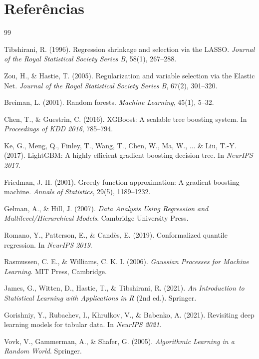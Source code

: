 \documentclass[12pt,a4paper]{article}
\begin{document}
\section{Referências}

\begin{thebibliography}{99}

 Tibshirani, R. (1996). Regression shrinkage and selection via the LASSO. \textit{Journal of the Royal Statistical Society Series B}, 58(1), 267--288.

 Zou, H., \& Hastie, T. (2005). Regularization and variable selection via the Elastic Net. \textit{Journal of the Royal Statistical Society Series B}, 67(2), 301--320.

 Breiman, L. (2001). Random forests. \textit{Machine Learning}, 45(1), 5--32.

 Chen, T., \& Guestrin, C. (2016). XGBoost: A scalable tree boosting system. In \textit{Proceedings of KDD 2016}, 785--794.

 Ke, G., Meng, Q., Finley, T., Wang, T., Chen, W., Ma, W., ... \& Liu, T.-Y. (2017). LightGBM: A highly efficient gradient boosting decision tree. In \textit{NeurIPS 2017}.

 Friedman, J. H. (2001). Greedy function approximation: A gradient boosting machine. \textit{Annals of Statistics}, 29(5), 1189--1232.

 Gelman, A., \& Hill, J. (2007). \textit{Data Analysis Using Regression and Multilevel/Hierarchical Models}. Cambridge University Press.

 Romano, Y., Patterson, E., \& Candès, E. (2019). Conformalized quantile regression. In \textit{NeurIPS 2019}.

 Rasmussen, C. E., \& Williams, C. K. I. (2006). \textit{Gaussian Processes for Machine Learning}. MIT Press, Cambridge.

 James, G., Witten, D., Hastie, T., \& Tibshirani, R. (2021). \textit{An Introduction to Statistical Learning with Applications in R} (2nd ed.). Springer.

 Gorishniy, Y., Rubachev, I., Khrulkov, V., \& Babenko, A. (2021). Revisiting deep learning models for tabular data. In \textit{NeurIPS 2021}.

 Vovk, V., Gammerman, A., \& Shafer, G. (2005). \textit{Algorithmic Learning in a Random World}. Springer.

\end{thebibliography}
\end{document}
